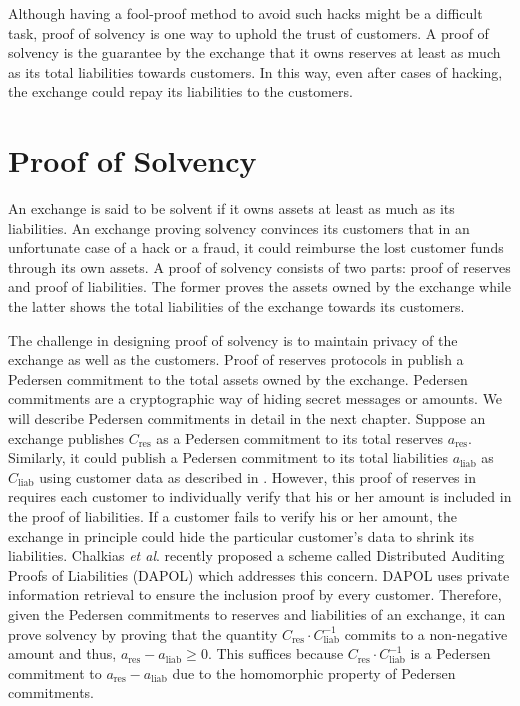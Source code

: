 Although having a fool-proof method to avoid such hacks might be a difficult task, proof of solvency is one way to uphold the trust of customers.
A proof of solvency is the guarantee by the exchange that it owns reserves at least as much as its total liabilities towards customers. 
In this way, even after cases of hacking, the exchange could repay its liabilities to the customers.


\section{Proof of Solvency}

An exchange is said to be solvent if it owns assets at least as much as its liabilities.
An exchange proving solvency convinces its customers that in an unfortunate case of a hack or a fraud, it could reimburse the lost customer funds through its own assets.
A proof of solvency consists of two parts: proof of reserves and proof of liabilities.
The former proves the assets owned by the exchange while the latter shows the total liabilities of the exchange towards its customers.

The challenge in designing proof of solvency is to maintain privacy of the exchange as well as the customers.
Proof of reserves protocols in \cite{Dagher2015,Dutta2019a,Dutta2019b} publish a Pedersen commitment to the total assets owned by the exchange.
Pedersen commitments are a cryptographic way of hiding secret messages or amounts. We will describe Pedersen commitments in detail in the next chapter.
Suppose an exchange publishes $C_{\text{res}}$ as a Pedersen commitment to its total reserves $a_{\text{res}}$.
Similarly, it could publish a Pedersen commitment to its total liabilities $a_{\text{liab}}$ as $C_{\text{liab}}$ using customer data as described in \cite{Dagher2015}.
However, this proof of reserves in \cite{Dagher2015} requires each customer to individually verify that his or her amount is included in the proof of liabilities.
If a customer fails to verify his or her amount, the exchange in principle could hide the particular customer's data to shrink its liabilities.
Chalkias \textit{et al}. \cite{Chalkias2020} recently proposed a scheme called Distributed Auditing Proofs of Liabilities (DAPOL) which addresses this concern. 
DAPOL uses private information retrieval to ensure the inclusion proof by every customer.
Therefore, given the Pedersen commitments to reserves and liabilities of an exchange, it can prove solvency by proving that the quantity $C_{\text{res}} \cdot C_{\text{liab}}^{-1}$ commits to a non-negative amount and thus, $a_{\text{res}} - a_{\text{liab}} \ge 0$.
This suffices because $C_{\text{res}} \cdot C_{\text{liab}}^{-1}$ is a Pedersen commitment to $a_{\text{res}} - a_{\text{liab}}$ due to the homomorphic property of Pedersen commitments.

